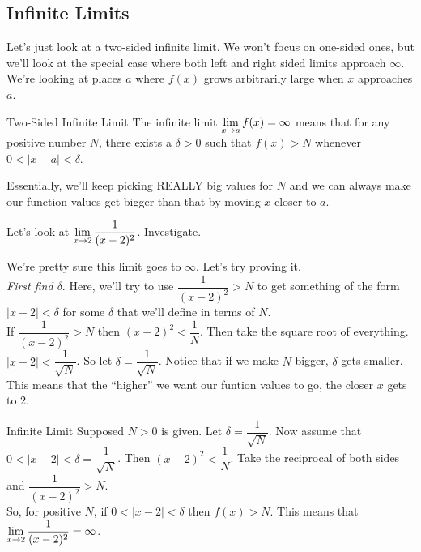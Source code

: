 \subsection*{Infinite Limits}

Let's just look at a two-sided infinite limit. We won't focus on one-sided ones, but we'll look at the special case where both left and right sided limits approach $\infty$.\\

We're looking at places $a$ where $f(x)$ grows arbitrarily large when $x$ approaches $a$.

\begin{defn}{Two-Sided Infinite Limit}
The infinite limit $\displaystyle \lim_{x\to a}f(x) = \infty$ means that for any positive number $N$, there exists a $\delta>0$ such that $f(x)>N$ whenever $0<|x-a|<\delta$.
\end{defn}

Essentially, we'll keep picking REALLY big values for $N$ and we can always make our function values get bigger than that by moving $x$ closer to $a$.

Let's look at $\displaystyle \lim_{x\to 2} \dfrac{1}{(x-2)^2}$. Investigate.

We're pretty sure this limit goes to $\infty$. Let's try proving it.\\

\textit{First find $\delta$}. Here, we'll try to use $\dfrac{1}{(x-2)^2}>N$ to get something of the form $|x-2|<\delta$ for some $\delta$ that we'll define in terms of $N$.\\

If $\dfrac{1}{(x-2)^2}>N$ then $(x-2)^2<\dfrac{1}{N}$. Then take the square root of everything. $|x-2|<\dfrac{1}{\sqrt{N}}$. So let $\delta=\dfrac{1}{\sqrt{N}}$. Notice that if we make $N$ bigger, $\delta$ gets smaller. This means that the ``higher'' we want our funtion values to go, the closer $x$ gets to $2$.

\begin{prf}{Infinite Limit}
Supposed $N>0$ is given. Let $\delta=\dfrac{1}{\sqrt{N}}$. Now assume that $0<|x-2|<\delta=\dfrac{1}{\sqrt{N}}$. Then $(x-2)^2<\dfrac{1}{N}$. Take the reciprocal of both sides and $\dfrac{1}{(x-2)^2}>N$.\\

So, for positive $N$, if $0<|x-2|<\delta$ then $f(x)>N$. This means that $\displaystyle \lim_{x\to 2}\dfrac{1}{(x-2)^2}=\infty$.
\end{prf}
